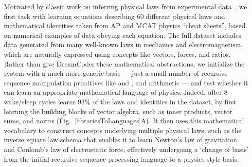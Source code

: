 \documentclass[12pt]{article}
\begin{document}
%
%
%

Motivated by classic work on
inferring physical laws from experimental data~\cite{simon1981scientific,langley1987scientific,schmidt2009distilling}, 
we first task \system with learning equations describing 60 different physical laws and mathematical identities taken from
AP and MCAT physics ``cheat sheets'', based on numerical examples of data obeying each equation. 
The full dataset includes %
data generated from many well-known laws in mechanics and electromagnetism, which are naturally expressed using
concepts like vectors, forces, and ratios.
Rather than give DreamCoder these mathematical abstractions, we initialize the system with a much more generic basis --- just a small number of recursive sequence manipulation primitives like
 and , and arithmetic --- and test whether it can learn an appropriate mathematical language of physics.
Indeed, after 8 wake/sleep cycles \system learns 93\% of the laws and identities in the dataset, %
by first learning the building blocks of vector algebra,
such as inner products, vector sums, and norms (Fig.~\ref{librariesToLanguages}A).
It then uses this mathematical vocabulary to construct concepts underlying multiple physical laws, such as the inverse square law schema that enables it to learn Newton's law of gravitation and Coulomb's law of electrostatic force, %
effectively undergoing a `change of basis' from the initial recursive sequence processing language to a physics-style basis. %
\end{document}
